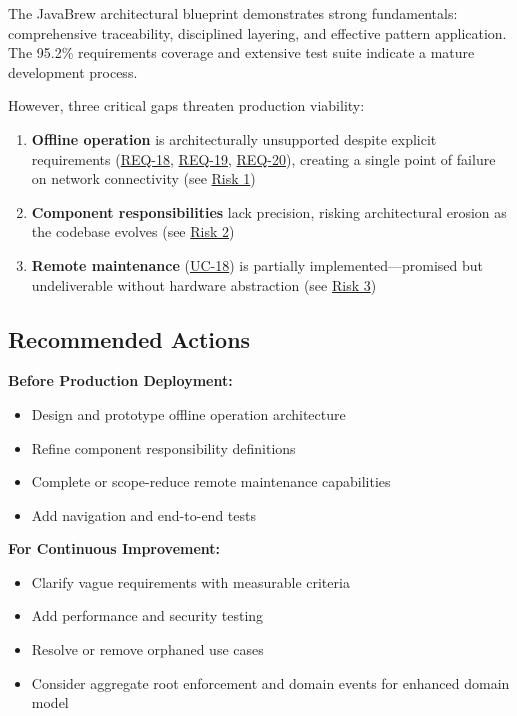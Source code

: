 \documentclass[11pt,a4paper]{article}
\begin{document}
The JavaBrew architectural blueprint demonstrates strong fundamentals: comprehensive traceability, disciplined layering, and effective pattern application. The 95.2\% requirements coverage and extensive test suite indicate a mature development process.

However, three critical gaps threaten production viability:

\begin{enumerate}
    \item \textbf{Offline operation} is architecturally unsupported despite explicit requirements (\hyperref[req:offline-tracking]{REQ-18}, \hyperref[req:offline-sync]{REQ-19}, \hyperref[req:offline-cash]{REQ-20}), creating a single point of failure on network connectivity (see \hyperref[risk:offline]{Risk 1})
    \item \textbf{Component responsibilities} lack precision, risking architectural erosion as the codebase evolves (see \hyperref[risk:offline]{Risk 2})
    \item \textbf{Remote maintenance} (\hyperref[uc:remote-maintenance]{UC-18}) is partially implemented—promised but undeliverable without hardware abstraction (see \hyperref[risk:remote-maintenance]{Risk 3})
\end{enumerate}

\subsection{Recommended Actions}

\textbf{Before Production Deployment:}
\begin{itemize}
    \item Design and prototype offline operation architecture
    \item Refine component responsibility definitions
    \item Complete or scope-reduce remote maintenance capabilities
    \item Add navigation and end-to-end tests
\end{itemize}

\textbf{For Continuous Improvement:}
\begin{itemize}
    \item Clarify vague requirements with measurable criteria
    \item Add performance and security testing
    \item Resolve or remove orphaned use cases
    \item Consider aggregate root enforcement and domain events for enhanced domain model
\end{itemize}
\end{document}
